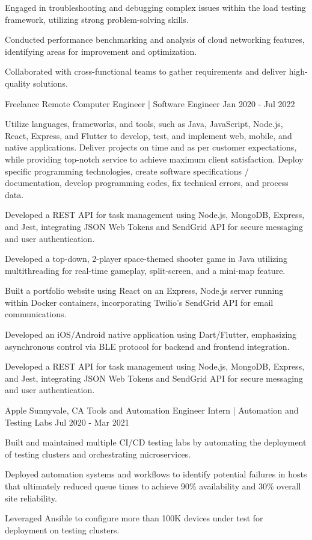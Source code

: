 \documentclass{resume}
\begin{document}
{{        \item Engaged in troubleshooting and debugging complex issues within the load testing framework, utilizing strong problem-solving skills.
        \item Conducted performance benchmarking and analysis of cloud networking features, identifying areas for improvement and optimization.
        \item Collaborated with cross-functional teams to gather requirements and deliver high-quality solutions.
        \vspace{0.5em}%
    }
    \experienceItem
    {Freelance}
    {Remote}
    {Computer Engineer | Software Engineer}
    {Jan 2020 - Jul 2022}
    {%
        \item Utilize languages, frameworks, and tools, such as Java, JavaScript, Node.js, React, Express, and Flutter to develop, test, and implement web, mobile, and native applications. Deliver projects on time and as per customer expectations, while providing top-notch service to achieve maximum client satisfaction. Deploy specific programming technologies, create software specifications / documentation, develop programming codes, fix technical errors, and process data.
        \item Developed a REST API for task management using Node.js, MongoDB, Express, and Jest, integrating JSON Web Tokens and SendGrid API for secure messaging and user authentication.
        \item Developed a top-down, 2-player space-themed shooter game in Java utilizing multithreading for real-time gameplay, split-screen, and a mini-map feature.
        \item Built a portfolio website using React on an Express, Node.js server running within Docker containers, incorporating Twilio’s SendGrid API for email communications.
        \item Developed an iOS/Android native application using Dart/Flutter, emphasizing asynchronous control via BLE protocol for backend and frontend integration.
        \item Developed a REST API for task management using Node.js, MongoDB, Express, and Jest, integrating JSON Web Tokens and SendGrid API for secure messaging and user authentication.
    }
    \experienceItem
    {Apple}
    {Sunnyvale, CA}
    {Tools and Automation Engineer Intern | Automation and Testing Labs}
    {Jul 2020 - Mar 2021}
    {%
        \item Built and maintained multiple CI/CD testing labs by automating the deployment of testing clusters and orchestrating microservices.
        \item Deployed automation systems and workflows to identify potential failures in hosts that ultimately reduced queue times to achieve 90\% availability and 30\% overall site reliability.
        \item Leveraged Ansible to configure more than 100K devices under test for deployment on testing clusters.
    }

}
\end{document}
